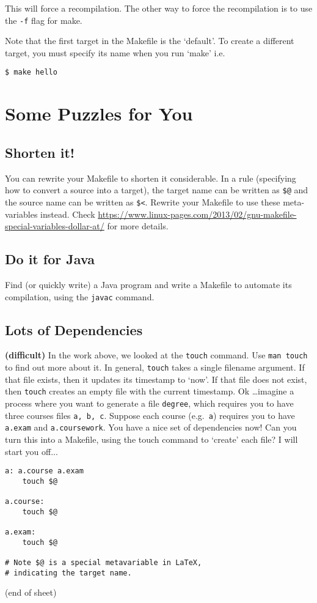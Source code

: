 \documentclass{article}
\begin{document}
This will force a recompilation. The other way to force the recompilation is to use the \texttt{-f} flag for make. 

Note that the first target in the Makefile is the `default'. To create a different target, you must specify its name when you run `make' i.e.
\begin{lstlisting}[style=BashInputStyle]
    $ make hello
\end{lstlisting}

\section*{Some Puzzles for You}

\subsection{Shorten it!}
You can rewrite your Makefile to shorten it considerable. In a rule (specifying how to convert a source into a target), the target name can be written as \verb+$@+ and the source name can be written as \verb+$<+. Rewrite your Makefile to use these meta-variables instead. Check \url{https://www.linux-pages.com/2013/02/gnu-makefile-special-variables-dollar-at/} for more details.

\subsection{Do it for Java}
Find (or quickly write) a Java program and write a Makefile to automate its compilation, using the \texttt{javac} command.

\subsection{Lots of Dependencies}
\textbf{(difficult)} In the work above, we looked at the \texttt{touch} command. Use \texttt{man touch} to find out more about it. In general, \texttt{touch} takes a single filename argument. If that file exists, then it updates its timestamp to `now'. If that file does not exist, then \texttt{touch} creates an empty file with the current timestamp. Ok \ldots imagine a process where you want to generate a file \texttt{degree}, which requires you to have three courses files \texttt{a, b, c}. Suppose each course (e.g.\ \texttt{a}) requires you to have \texttt{a.exam} and \texttt{a.coursework}. You have a nice set of dependencies now!  Can you turn this into a Makefile, using the touch command to `create' each file? I will start you off...


\begin{lstlisting}[style=MakeProg]
a: a.course a.exam
    touch $@

a.course:
    touch $@

a.exam:
    touch $@

# Note $@ is a special metavariable in LaTeX,
# indicating the target name.
\end{lstlisting}

(end of sheet)
\end{document}
